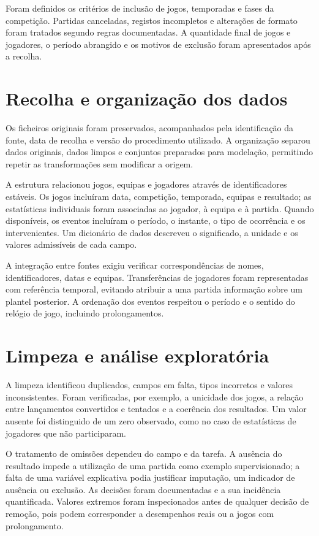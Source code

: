 Foram definidos os critérios de inclusão de jogos, temporadas e fases
da competição. Partidas canceladas, registos incompletos e alterações
de formato foram tratados segundo regras documentadas. A quantidade
final de jogos e jogadores, o período abrangido e os motivos de exclusão
foram apresentados após a recolha.

\section{Recolha e organização dos dados}

Os ficheiros originais foram preservados, acompanhados pela identificação
da fonte, data de recolha e versão do procedimento utilizado. A organização
separou dados originais, dados limpos e conjuntos preparados para
modelação, permitindo repetir as transformações sem modificar a origem.

A estrutura relacionou jogos, equipas e jogadores através de
identificadores estáveis. Os jogos incluíram data, competição, temporada,
equipas e resultado; as estatísticas individuais foram associadas ao
jogador, à equipa e à partida. Quando disponíveis, os eventos incluíram
o período, o instante, o tipo de ocorrência e os intervenientes.
Um dicionário de dados descreveu o significado, a unidade e os valores
admissíveis de cada campo.

A integração entre fontes exigiu verificar correspondências de nomes,
identificadores, datas e equipas. Transferências de jogadores foram
representadas com referência temporal, evitando atribuir a uma partida
informação sobre um plantel posterior. A ordenação dos eventos respeitou
o período e o sentido do relógio de jogo, incluindo prolongamentos.

\section{Limpeza e análise exploratória}

A limpeza identificou duplicados, campos em falta, tipos incorretos e
valores inconsistentes. Foram verificadas, por exemplo, a unicidade dos
jogos, a relação entre lançamentos convertidos e tentados e a coerência
dos resultados. Um valor ausente foi distinguido de um zero observado,
como no caso de estatísticas de jogadores que não participaram.

O tratamento de omissões dependeu do campo e da tarefa. A ausência do
resultado impede a utilização de uma partida como exemplo supervisionado;
a falta de uma variável explicativa podia justificar imputação, um
indicador de ausência ou exclusão. As decisões foram documentadas e a
sua incidência quantificada. Valores extremos foram inspecionados antes
de qualquer decisão de remoção, pois podem corresponder a desempenhos reais ou a
jogos com prolongamento.

